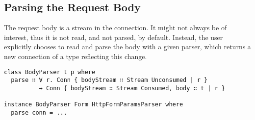 \documentclass[11pt]{article}
\begin{document}
\subsection{Parsing the Request Body}
\label{sec-2-3}

The request body is a stream in the connection. It might not always be
of interest, thus it is not read, and not parsed, by default. Instead,
the user explicitly chooses to read and parse the body with a given
parser, which returns a new connection of a type reflecting this
change.

\begin{verbatim}
class BodyParser t p where
  parse ∷ ∀ r. Conn { bodyStream ∷ Stream Unconsumed | r }
          → Conn { bodyStream ∷ Stream Consumed, body ∷ t | r }

instance BodyParser Form HttpFormParamsParser where
  parse conn = ...
\end{verbatim}
\end{document}
